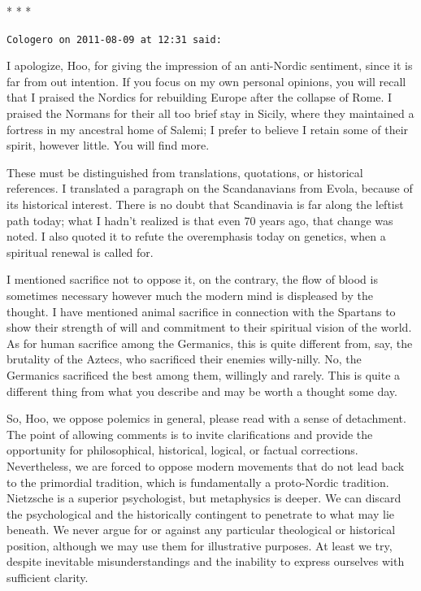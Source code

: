 \begin{center}* * *\end{center}

\begin{footnotesize}
\begin{sffamily}

\texttt{Cologero on 2011-08-09 at 12:31 said:}

I apologize, Hoo, for giving the impression of an anti-Nordic sentiment, since it is far from out intention. If you focus on my own personal opinions, you will recall that I praised the Nordics for rebuilding Europe after the collapse of Rome. I praised the Normans for their all too brief stay in Sicily, where they maintained a fortress in my ancestral home of Salemi; I prefer to believe I retain some of their spirit, however little. You will find more.

These must be distinguished from translations, quotations, or historical references. I translated a paragraph on the Scandanavians from Evola, because of its historical interest. There is no doubt that Scandinavia is far along the leftist path today; what I hadn't realized is that even 70 years ago, that change was noted. I also quoted it to refute the overemphasis today on genetics, when a spiritual renewal is called for.

I mentioned sacrifice not to oppose it, on the contrary, the flow of blood is sometimes necessary however much the modern mind is displeased by the thought. I have mentioned animal sacrifice in connection with the Spartans to show their strength of will and commitment to their spiritual vision of the world. As for human sacrifice among the Germanics, this is quite different from, say, the brutality of the Aztecs, who sacrificed their enemies willy-nilly. No, the Germanics sacrificed the best among them, willingly and rarely. This is quite a different thing from what you describe and may be worth a thought some day.

So, Hoo, we oppose polemics in general, please read with a sense of detachment. The point of allowing comments is to invite clarifications and provide the opportunity for philosophical, historical, logical, or factual corrections. Nevertheless, we are forced to oppose modern movements that do not lead back to the primordial tradition, which is fundamentally a proto-Nordic tradition. Nietzsche is a superior psychologist, but metaphysics is deeper. We can discard the psychological and the historically contingent to penetrate to what may lie beneath. We never argue for or against any particular theological or historical position, although we may use them for illustrative purposes. At least we try, despite inevitable misunderstandings and the inability to express ourselves with sufficient clarity.


\end{sffamily}
\end{footnotesize}
